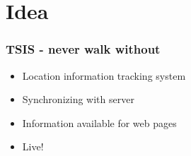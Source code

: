 \section{Idea}
\label{sec:idea}

\begin{frame}
  \frametitle{TSIS - never walk without}
\begin{itemize}
\item Location information tracking system
\item Synchronizing with server
\item Information available for web pages
\item Live!
\end{itemize}

\end{frame}
